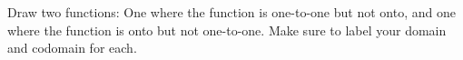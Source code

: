\documentclass[a4paper,12pt]{book}
\newcounter{question}
\begin{document}
    \begin{questionNOGRADE}{\thequestion}
    
        Draw two functions: One where the function is one-to-one but not onto,
        and one where the function is onto but not one-to-one.
        Make sure to label your domain and codomain for each.

        
    \end{questionNOGRADE}


    \notonkey{ \newpage }{ \hrulefill }
    
\end{document}
